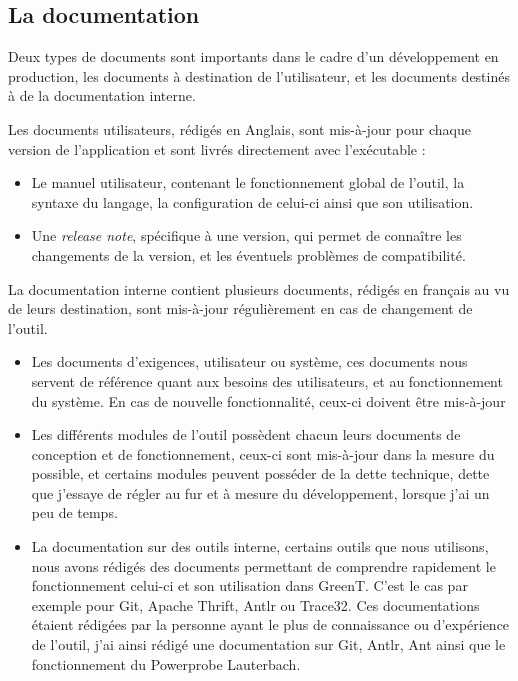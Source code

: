 \subsection{La documentation}
Deux types de documents sont importants dans le cadre d'un développement en production, les documents à destination de l'utilisateur, et les documents destinés à de la documentation interne. 

Les documents utilisateurs, rédigés en Anglais, sont mis-à-jour pour chaque version de l'application et sont livrés directement avec l'exécutable : 
\begin{itemize}
	\item Le manuel utilisateur, contenant le fonctionnement global de l'outil, la syntaxe du langage, la configuration de celui-ci ainsi que son utilisation.
	\item Une \textit{release note}, spécifique à une version, qui permet de connaître les changements de la version, et les éventuels problèmes de compatibilité.\newline
\end{itemize}

La documentation interne contient plusieurs documents, rédigés en français au vu de leurs destination, sont mis-à-jour régulièrement en cas de changement de l'outil.
\begin{itemize}
	\item Les documents d'exigences, utilisateur ou système, ces documents nous servent de référence quant aux besoins des utilisateurs, et au fonctionnement du système. En cas de nouvelle fonctionnalité, ceux-ci doivent être mis-à-jour
	\item Les différents modules de l'outil possèdent chacun leurs documents de conception et de fonctionnement, ceux-ci sont mis-à-jour dans la mesure du possible, et certains modules peuvent posséder de la dette technique, dette que j'essaye de régler au fur et à mesure du développement, lorsque j'ai un peu de temps.
	\item La documentation sur des outils interne, certains outils que nous utilisons, nous avons rédigés des documents permettant de comprendre rapidement le fonctionnement celui-ci et son utilisation dans GreenT. C'est le cas par exemple pour Git, Apache Thrift, Antlr ou Trace32. Ces documentations étaient rédigées par la personne ayant le plus de connaissance ou d'expérience de l'outil, j'ai ainsi rédigé une documentation sur Git, Antlr, Ant ainsi que le fonctionnement du Powerprobe Lauterbach.
\end{itemize}

